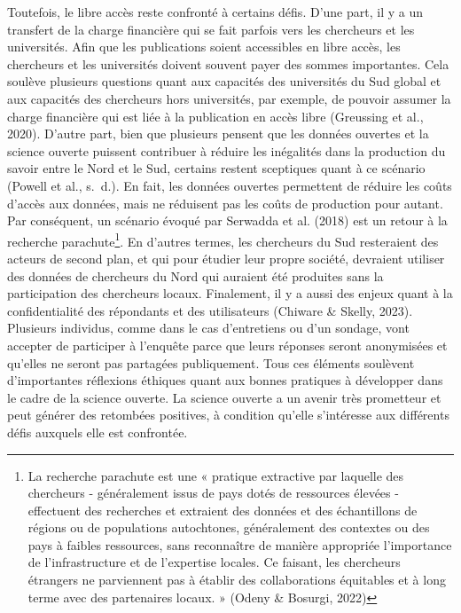 \documentclass[
  letterpaper,
  DIV=11,
  numbers=noendperiod,
  oneside]{scrreprt}
\begin{document}
Toutefois, le libre accès reste confronté à certains défis. D'une part,
il y a un transfert de la charge financière qui se fait parfois vers les
chercheurs et les universités. Afin que les publications soient
accessibles en libre accès, les chercheurs et les universités doivent
souvent payer des sommes importantes. Cela soulève plusieurs questions
quant aux capacités des universités du Sud global et aux capacités des
chercheurs hors universités, par exemple, de pouvoir assumer la charge
financière qui est liée à la publication en accès libre (Greussing et
al., 2020). D'autre part, bien que plusieurs pensent que les données
ouvertes et la science ouverte puissent contribuer à réduire les
inégalités dans la production du savoir entre le Nord et le Sud,
certains restent sceptiques quant à ce scénario (Powell et al., s.~d.).
En fait, les données ouvertes permettent de réduire les coûts d'accès
aux données, mais ne réduisent pas les coûts de production pour autant.
Par conséquent, un scénario évoqué par Serwadda et al. (2018) est un
retour à la recherche parachute\footnote{La recherche parachute est une
  « pratique extractive par laquelle des chercheurs - généralement issus
  de pays dotés de ressources élevées - effectuent des recherches et
  extraient des données et des échantillons de régions ou de populations
  autochtones, généralement des contextes ou des pays à faibles
  ressources, sans reconnaître de manière appropriée l'importance de
  l'infrastructure et de l'expertise locales. Ce faisant, les chercheurs
  étrangers ne parviennent pas à établir des collaborations équitables
  et à long terme avec des partenaires locaux. » (Odeny \& Bosurgi,
  2022)}. En d'autres termes, les chercheurs du Sud resteraient des
acteurs de second plan, et qui pour étudier leur propre société,
devraient utiliser des données de chercheurs du Nord qui auraient été
produites sans la participation des chercheurs locaux. Finalement, il y
a aussi des enjeux quant à la confidentialité des répondants et des
utilisateurs (Chiware \& Skelly, 2023). Plusieurs individus, comme dans
le cas d'entretiens ou d'un sondage, vont accepter de participer à
l'enquête parce que leurs réponses seront anonymisées et qu'elles ne
seront pas partagées publiquement. Tous ces éléments soulèvent
d'importantes réflexions éthiques quant aux bonnes pratiques à
développer dans le cadre de la science ouverte. La science ouverte a un
avenir très prometteur et peut générer des retombées positives, à
condition qu'elle s'intéresse aux différents défis auxquels elle est
confrontée.
\end{document}
